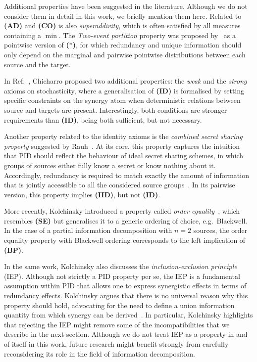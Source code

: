 \documentclass{article}
\newcommand{\ID}{\textbf{(ID)}\xspace} %
\newcommand{\IID}{\textbf{(IID)}\xspace} %
\newcommand{\BP}{\textbf{(BP)}\xspace} %
\newcommand{\AST}{\textbf{($\boldsymbol{\ast}$)}\xspace} %
\newcommand{\AD}{\textbf{(AD)}\xspace} %
\newcommand{\CO}{\textbf{(CO)}\xspace} %
\newcommand{\SE}{\textbf{(SE)}\xspace} %
\begin{document}
Additional properties have been suggested in the literature. Although we do not consider them in detail in this work, we briefly mention them here. Related to \AD and \CO is also \textit{superaddivity}, which is often satisfied by all measures containing a $\min$. The \textit{Two-event partition} property was proposed by~\cite{finn2018pointwise} as a pointwise version of \AST, for which redundancy and unique information should only depend on the marginal and pairwise pointwise distributions between each source and the target. %

In Ref.~\cite{chicharro2018identity}, Chicharro proposed two additional properties: the \textit{weak} and the \textit{strong} axioms on stochasticity, where a generalisation of \ID is formalised by setting specific constraints on the synergy atom when deterministic relations between source and targets are present. Interestingly, both conditions are stronger requirements than \ID, being both sufficient, but not necessary.

Another property related to the identity axioms is the \textit{combined secret sharing property} suggested by Rauh~\cite{rauh2017secret}. At its core, this property captures the intuition that PID should reflect the behaviour of ideal secret sharing schemes, in which groups of sources either fully know a secret or know nothing about it. Accordingly, redundancy is required to match exactly the amount of information that is jointly accessible to all the considered source groups~\cite{rauh2017secret}. In its pairwise version, this property implies \IID, but not \ID.

More recently, Kolchinsky introduced a property called \textit{order equality}~\cite{kolchinsky2022novel}, which resembles \SE but generalises it to a generic ordering of choice, e.g.\ Blackwell. In the case of a partial information decomposition with $n=2$ sources, the order equality property with Blackwell ordering corresponds to the left implication of \BP.

In the same work, Kolchinsky also discusses the \textit{inclusion-exclusion principle} (IEP). Although not strictly a PID property per se, the IEP is a fundamental assumption within PID that allows one to express synergistic effects in terms of redundancy effects. Kolchinsky argues that there is no universal reason why this property should hold, advocating for the need to define a union information quantity from which synergy can be derived~\cite{kolchinsky2022novel}. In particular, Kolchinsky highlights that rejecting the IEP might remove some of the incompatibilities that we describe in the next section. Although we do not treat IEP as a property in and of itself in this work, future research might benefit strongly from carefully reconsidering its role in the field of information decomposition.
\end{document}
